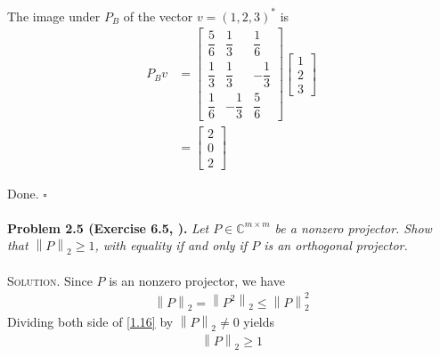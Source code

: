 \documentclass[a4paper,oneside]{book}
\numberwithin{equation}{chapter}
\begin{document}
\begin{enumerate}
The image under $P_B$ of the vector $v=\left(1,2,3\right)^*$ is
\begin{align}
{P_B}v &= \left[ {\begin{array}{*{20}{c}}
{\dfrac{5}{6}}&{\dfrac{1}{3}}&{\dfrac{1}{6}}\\
{\dfrac{1}{3}}&{\dfrac{1}{3}}&{ - \dfrac{1}{3}}\\
{\dfrac{1}{6}}&{ - \dfrac{1}{3}}&{\dfrac{5}{6}}
\end{array}} \right]\left[ {\begin{array}{*{20}{c}}
1\\
2\\
3
\end{array}} \right]\\
& = \left[ {\begin{array}{*{20}{c}}
2\\
0\\
2
\end{array}} \right]
\end{align}
\end{enumerate}
Done. \hfill $\square$\\
\\
\textbf{Problem 2.5 (Exercise 6.5, \cite{1}).} \textit{Let $P \in \mathbb{C}^{m\times m}$ be a nonzero projector. Show that ${\left\| P \right\|_2} \ge 1$, with equality if and only if $P$ is an orthogonal projector.}\\
\\
\textsc{Solution.} Since $P$ is an nonzero projector, we have
\begin{align}
\label{1.16}
{\left\| P \right\|_2} = {\left\| {{P^2}} \right\|_2} \le \left\| P \right\|_2^2
\end{align}
Dividing both side of \eqref{1.16} by ${\left\| P \right\|_2} \ne 0$ yields
\begin{align}
\label{1.17}
{\left\| P \right\|_2} \ge 1
\end{align}
\end{document}
